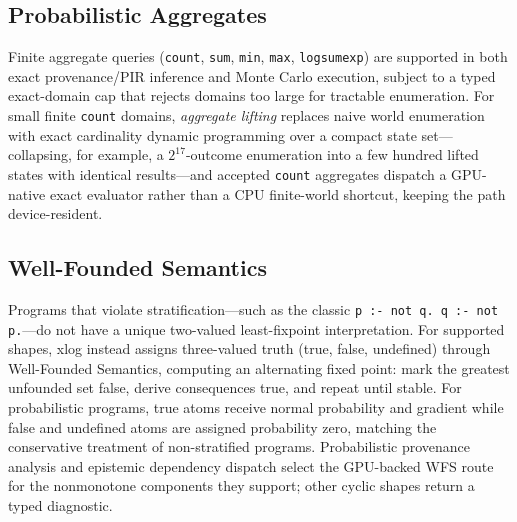 \subsection{Probabilistic Aggregates}

Finite aggregate queries (\texttt{count}, \texttt{sum}, \texttt{min}, \texttt{max}, \texttt{logsumexp}) are supported in both exact provenance/PIR inference and Monte Carlo execution, subject to a typed exact-domain cap that rejects domains too large for tractable enumeration. For small finite \texttt{count} domains, \emph{aggregate lifting} replaces naive world enumeration with exact cardinality dynamic programming over a compact state set---collapsing, for example, a $2^{17}$-outcome enumeration into a few hundred lifted states with identical results---and accepted \texttt{count} aggregates dispatch a GPU-native exact evaluator rather than a CPU finite-world shortcut, keeping the path device-resident.

\subsection{Well-Founded Semantics}

Programs that violate stratification---such as the classic \texttt{p :- not q.\ q :- not p.}---do not have a unique two-valued least-fixpoint interpretation. For supported shapes, xlog instead assigns three-valued truth (true, false, undefined) through Well-Founded Semantics, computing an alternating fixed point: mark the greatest unfounded set false, derive consequences true, and repeat until stable. For probabilistic programs, true atoms receive normal probability and gradient while false and undefined atoms are assigned probability zero, matching the conservative treatment of non-stratified programs. Probabilistic provenance analysis and epistemic dependency dispatch select the GPU-backed WFS route for the nonmonotone components they support; other cyclic shapes return a typed diagnostic.
